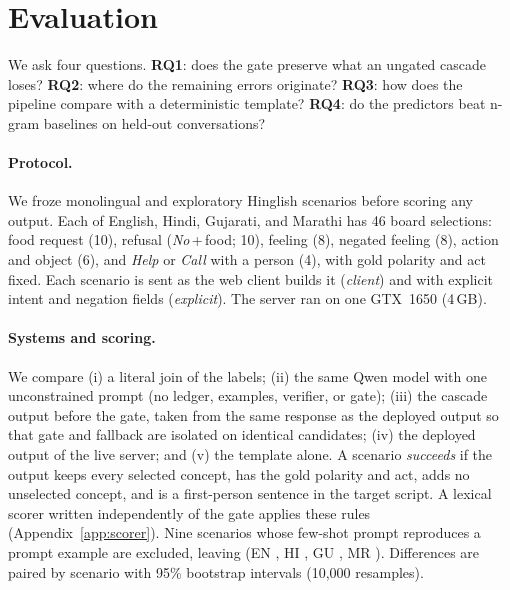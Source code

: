 \section{Evaluation}
\label{sec:eval}

We ask four questions. \textbf{RQ1}: does the gate preserve what an ungated cascade loses? \textbf{RQ2}: where do the remaining errors originate? \textbf{RQ3}: how does the pipeline compare with a deterministic template? \textbf{RQ4}: do the predictors beat n-gram baselines on held-out conversations?

\paragraph{Protocol.}
We froze \NScen{} monolingual and \NScenCM{} exploratory Hinglish scenarios before scoring any output.
Each of English, Hindi, Gujarati, and Marathi has 46 board selections: food request (10), refusal (\emph{No}\,+\,food; 10), feeling (8), negated feeling (8), action and object (6), and \emph{Help} or \emph{Call} with a person (4), with gold polarity and act fixed.
Each scenario is sent as the web client builds it (\emph{client}) and with explicit intent and negation fields (\emph{explicit}).
The server ran on one GTX~1650 (4\,GB).

\paragraph{Systems and scoring.}
We compare (i) a literal join of the labels; (ii) the same Qwen model with one unconstrained prompt (no ledger, examples, verifier, or gate); (iii) the cascade output before the gate, taken from the same response as the deployed output so that gate and fallback are isolated on identical candidates; (iv) the deployed output of the live server; and (v) the template alone.
A scenario \emph{succeeds} if the output keeps every selected concept, has the gold polarity and act, adds no unselected concept, and is a first-person sentence in the target script.
A lexical scorer written independently of the gate applies these rules (Appendix~\ref{app:scorer}).
Nine scenarios whose few-shot prompt reproduces a prompt example are excluded, leaving \NPrimAll{} (EN \NPrimEN{}, HI \NPrimHI{}, GU \NPrimGU{}, MR \NPrimMR{}).
Differences are paired by scenario with 95\% bootstrap intervals (10,000 resamples).



